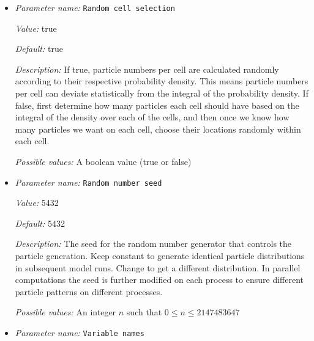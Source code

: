 \begin{itemize}
{\it Possible values:} Any string
\item {\it Parameter name:} {\tt Random cell selection}
\label{parameters:Postprocess/Particles/Generator/Probability density function/Random cell selection}
\label{parameters:Postprocess/Particles/Generator/Probability_20density_20function/Random_20cell_20selection}


{\it Value:} true


{\it Default:} true


{\it Description:} If true, particle numbers per cell are calculated randomly according to their respective probability density. This means particle numbers per cell can deviate statistically from the integral of the probability density. If false, first determine how many particles each cell should have based on the integral of the density over each of the cells, and then once we know how many particles we want on each cell, choose their locations randomly within each cell.


{\it Possible values:} A boolean value (true or false)
\item {\it Parameter name:} {\tt Random number seed}
\label{parameters:Postprocess/Particles/Generator/Probability density function/Random number seed}
\label{parameters:Postprocess/Particles/Generator/Probability_20density_20function/Random_20number_20seed}


{\it Value:} 5432


{\it Default:} 5432


{\it Description:} The seed for the random number generator that controls the particle generation. Keep constant to generate identical particle distributions in subsequent model runs. Change to get a different distribution. In parallel computations the seed is further modified on each process to ensure different particle patterns on different processes.


{\it Possible values:} An integer $n$ such that $0\leq n \leq 2147483647$
\item {\it Parameter name:} {\tt Variable names}
\label{parameters:Postprocess/Particles/Generator/Probability density function/Variable names}
\label{parameters:Postprocess/Particles/Generator/Probability_20density_20function/Variable_20names}



\end{itemize}
